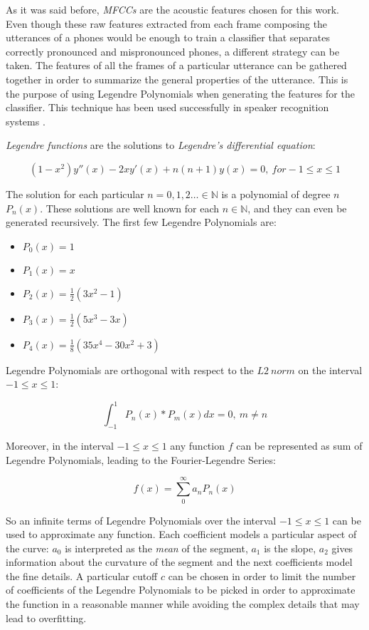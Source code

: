 As it was said before, \textit{MFCCs} are the acoustic features chosen for this work.
Even though these raw features extracted from each frame composing the utterances of a phones
would be enough to train a classifier that separates correctly
pronounced and mispronounced phones, a different strategy can be taken. The features of all the
frames of a particular utterance can be gathered together in order to summarize the
general properties of the utterance. This is the purpose of using Legendre Polynomials when
generating the features for the classifier. This technique has been used successfully
in speaker recognition systems \cite{legendre}.

\textit{Legendre functions} are the solutions to \textit{Legendre's differential equation}:

\begin{equation}
(1-x^{2})y''(x)-2xy'(x)+n(n+1)y(x)=0, \ for -1 \leq x \leq 1
\end{equation}

The solution for each particular $n={0, 1, 2 \dotsc} \in \mathbb{N}$ is a polynomial of degree
$n$ $P_{n}(x)$. These solutions are well known for each $n \in \mathbb{N}$, and they can even
be generated recursively. The first few Legendre Polynomials are:

\begin{itemize}
  \item[] $P_{0}(x) = 1$
  \item[] $P_{1}(x) = x$
  \item[] $P_{2}(x) = \frac{1}{2}(3x^{2} - 1)$
  \item[] $P_{3}(x) = \frac{1}{2}(5x^{3} - 3x)$
  \item[] $P_{4}(x) = \frac{1}{8}(35x^{4} - 30x^{2} + 3)$
\end{itemize}

Legendre Polynomials are orthogonal with respect to the $L2 \ norm$ on the interval \mbox{$-1 \leq x \leq 1$}:

\begin{equation}
\int_{-1}^{1} P_{n}(x)*P_{m}(x)dx = 0, \ m \neq n
\end{equation}

Moreover, in the interval \mbox{$-1 \leq x \leq 1$} any function $f$ can be represented as sum of
Legendre Polynomials, leading to the Fourier-Legendre Series:

\begin{equation}
f(x) = \sum_{0}^{\infty}a_{n}P_{n}(x)
\end{equation}

So an infinite terms of Legendre Polynomials over the interval \mbox{$-1 \leq x \leq 1$} can be used
to approximate any function. Each coefficient models a particular aspect of the curve: $a_{0}$
is interpreted as the \textit{mean} of the segment, $a_{1}$ is the slope, $a_{2}$ gives
information about the curvature of the segment and the next coefficients model the fine details.
A particular cutoff $c$ can be chosen in order to limit the number of coefficients of the
Legendre Polynomials to be picked in order to approximate the function in a reasonable manner
while avoiding the complex details that may lead to overfitting.